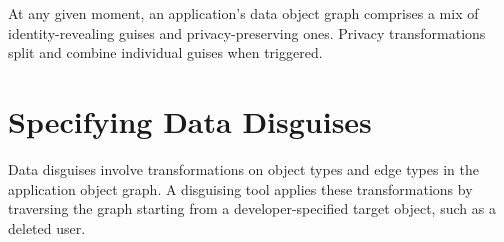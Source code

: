 %
At any given moment, an application's data object graph comprises a mix of
identity-revealing guises and privacy-preserving ones. Privacy transformations split
and combine individual guises when triggered.
%
%

\section{Specifying Data Disguises}
\label{sec:policies}

%
Data disguises involve transformations on object types and edge types in the
application object graph.
%
A disguising tool applies these transformations by traversing the graph starting from a
developer-specified target object, such as a deleted user.
%

